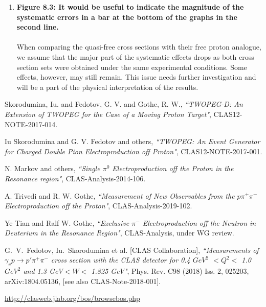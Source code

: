 \documentclass[,superscriptaddress,showpacs,amssymb,amsmath,amsfonts,linenumbers,article]{revtex4-1}
\begin{document}
\begin{enumerate}[label=\textbf{\arabic*}.]
Note also that the total systematic uncertainty provided in the cross section plots in App.~F reflects this feature, e.g. with the average value of 7.4\% among all $W$ and $Q^{2}$ bin, the total systematic uncertainty reaches the value of 11.9\% for the first $W$ bin at $Q^{2} = 0.675$~GeV$^{2}$.

\item {\bf Figure 8.3: It would be useful to indicate the magnitude of the systematic errors in a bar at the bottom of the graphs in the second line.}\\ \\
When comparing the quasi-free cross sections with their free proton analogue, we assume that the major part of the systematic effects drops as both cross section sets were obtained under the same experimental conditions. Some effects, however, may still remain. This issue needs further investigation and will be a part of the physical interpretation of the results.



\end{enumerate}

\begin{thebibliography}{9} 



 Skorodumina, {\relax Iu}. and Fedotov, G. V. and Gothe, R. W.,
\textit{``TWOPEG-D: An Extension of TWOPEG for the Case of a Moving Proton Target"}, CLAS12-NOTE-2017-014.


 {\relax Iu} Skorodumina and G. V. Fedotov and others,
\textit{``TWOPEG: An Event Generator for Charged Double Pion Electroproduction off Proton"}, CLAS12-NOTE-2017-001.

N. Markov and others,
\textit{``Single $\pi^{0}$ Electroproduction off the Proton in the Resonance region"}, CLAS-Analysis-2014-106.

A. Trivedi and R. W. Gothe,
\textit{``Measurement of New Observables from the $p\pi^{+}\pi^{-}$ Electroproduction off the Proton"}, CLAS-Analysis-2019-102.

Ye Tian and Ralf W. Gothe,
\textit{``Exclusive $\pi^{-}$ Electroproduction off the Neutron in Deuterium in the Resonance Region"}, CLAS-Analysis, under WG review.

G.~V.~Fedotov, Iu.~Skorodumina et al. [CLAS Collaboration],
\textit{``Measurements of $\gamma_{v}p \rightarrow p' \pi^{+} \pi^{-}$ cross section with the CLAS detector for 0.4 $GeV^{2}$ $< Q^2 <$ 1.0 $GeV^{2}$ and 1.3 GeV$< W <$ 1.825 GeV"}, Phys. Rev. C98 (2018) Iss. 2, 025203, arXiv:1804.05136, [see also CLAS-Note-2018-001].

\url{http://clasweb.jlab.org/bos/browsebos.php}




\end{thebibliography}



 
\end{document}
